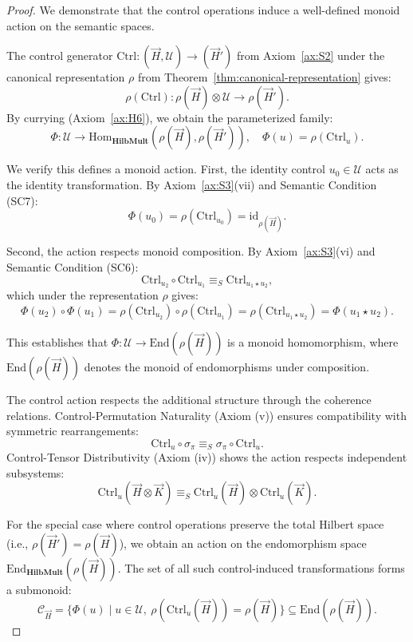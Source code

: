 \documentclass[11pt]{article}
\begin{document}
\begin{proof}
We demonstrate that the control operations induce a well-defined monoid action on the semantic spaces.

The control generator $\mathrm{Ctrl}: (\vec{H}, \mathcal{U}) \to (\vec{H}')$ from Axiom~\ref{ax:S2} under the canonical representation $\rho$ from Theorem~\ref{thm:canonical-representation} gives:
\[
\rho(\mathrm{Ctrl}): \rho(\vec{H}) \otimes \mathcal{U} \to \rho(\vec{H}').
\]
By currying (Axiom~\ref{ax:H6}), we obtain the parameterized family:
\[
\Phi: \mathcal{U} \to \mathrm{Hom}_{\mathbf{HilbMult}}(\rho(\vec{H}), \rho(\vec{H}')), \quad \Phi(u) = \rho(\mathrm{Ctrl}_u).
\]

We verify this defines a monoid action. First, the identity control $u_0 \in \mathcal{U}$ acts as the identity transformation. By Axiom~\ref{ax:S3}(vii) and Semantic Condition (SC7):
\[
\Phi(u_0) = \rho(\mathrm{Ctrl}_{u_0}) = \mathrm{id}_{\rho(\vec{H})}.
\]

Second, the action respects monoid composition. By Axiom~\ref{ax:S3}(vi) and Semantic Condition (SC6):
\[
\mathrm{Ctrl}_{u_2} \circ \mathrm{Ctrl}_{u_1} \equiv_S \mathrm{Ctrl}_{u_1 \star u_2},
\]
which under the representation $\rho$ gives:
\[
\Phi(u_2) \circ \Phi(u_1) = \rho(\mathrm{Ctrl}_{u_2}) \circ \rho(\mathrm{Ctrl}_{u_1}) = \rho(\mathrm{Ctrl}_{u_1 \star u_2}) = \Phi(u_1 \star u_2).
\]

This establishes that $\Phi: \mathcal{U} \to \mathrm{End}(\rho(\vec{H}))$ is a monoid homomorphism, where $\mathrm{End}(\rho(\vec{H}))$ denotes the monoid of endomorphisms under composition.

The control action respects the additional structure through the coherence relations. Control-Permutation Naturality (Axiom (v)) ensures compatibility with symmetric rearrangements:
\[
\mathrm{Ctrl}_u \circ \sigma_{\pi} \equiv_S \sigma_{\pi} \circ \mathrm{Ctrl}_u.
\]
Control-Tensor Distributivity (Axiom (iv)) shows the action respects independent subsystems:
\[
\mathrm{Ctrl}_u(\vec{H} \otimes \vec{K}) \equiv_S \mathrm{Ctrl}_u(\vec{H}) \otimes \mathrm{Ctrl}_u(\vec{K}).
\]

For the special case where control operations preserve the total Hilbert space (i.e., $\rho(\vec{H}') = \rho(\vec{H})$), we obtain an action on the endomorphism space $\mathrm{End}_{\mathbf{HilbMult}}(\rho(\vec{H}))$. The set of all such control-induced transformations forms a submonoid:
\[
\mathcal{C}_{\vec{H}} = \{\Phi(u) \mid u \in \mathcal{U},\ \rho(\mathrm{Ctrl}_u(\vec{H})) = \rho(\vec{H})\} \subseteq \mathrm{End}(\rho(\vec{H})).
\]


\end{proof}
\end{document}
